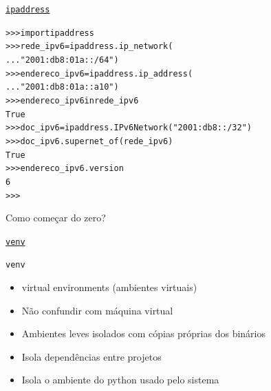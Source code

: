 \documentclass[11pt]{beamer}
\begin{document}
\begin{frame}[fragile]{\href{https://docs.python.org/3/library/ipaddress.html}{\texttt{ipaddress}}}
\hspace*{-2cm}
\vspace*{-1cm}
\begin{alltt}\small
>>> import ipaddress
>>> rede_ipv6 = ipaddress.ip_network(
...     "2001:db8:01a::/64")
>>> endereco_ipv6 = ipaddress.ip_address(
...     "2001:db8:01a::a10")
>>> endereco_ipv6 in rede_ipv6
True
>>> doc_ipv6 = ipaddress.IPv6Network("2001:db8::/32")
>>> doc_ipv6.supernet_of(rede_ipv6)
True
>>> endereco_ipv6.version
6
>>>
\end{alltt}
\end{frame}

\begin{frame}[standout]
  Como começar do zero?
\end{frame}

\begin{frame}[fragile]{\href{https://docs.python.org/3/library/venv.html}{\texttt{venv}}}
  \hspace*{-.5cm}
\end{frame}

\begin{frame}[fragile]{\texttt{venv}}
  \begin{itemize}
    \item virtual environments (ambientes virtuais)
    \item Não confundir com máquina virtual
    \item Ambientes leves isolados com cópias próprias dos binários
    \item Isola dependências entre projetos
    \item Isola o ambiente do python usado pelo sistema
  \end{itemize}
\end{frame}
\end{document}
